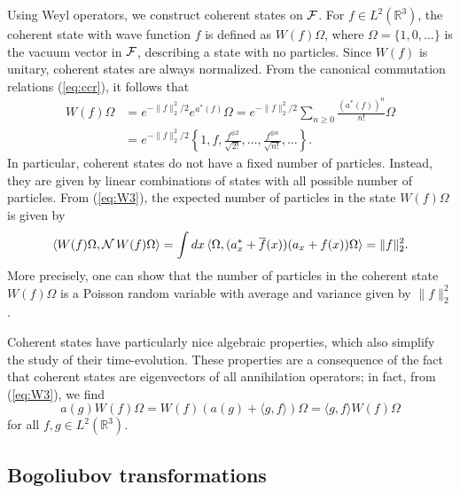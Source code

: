 \documentclass[11pt,a4paper]{article}
\newcommand{\bR}{{\mathbb R}}
\newcommand{\cF}{{\cal F}}
\newcommand{\cN}{{\cal N}}
\begin{document}
Using Weyl operators, we construct coherent states on $\cF$. For $f \in L^2 (\bR^3)$, the coherent state with wave function $f$ is defined as $W(f) \Omega$, where $\Omega = \{ 1, 0, \dots \}$ is the vacuum vector in $\cF$, describing a state with no particles. Since $W(f)$ is unitary, coherent states are always normalized. {F}rom the canonical commutation relations (\ref{eq:ccr}), it follows that  
\[ \begin{split} 
W(f) \Omega &= e^{-\| f \|_2^2 /2} e^{a^* (f)} \Omega = e^{-\| f\|_2^2/2}
\sum_{n \geq 0} \frac{(a^* (f))^n}{n!} \Omega \\ &= e^{-\| f\|_2^2/2}
\left\{ 1 , f , \frac{f^{\otimes 2}}{\sqrt{2!}} , \dots , \frac{f^{\otimes
n}}{\sqrt{n!}} , \dots \right\}. \end{split} \]
In particular, coherent states do not have a fixed number of particles. Instead, they are given by linear combinations of states with all possible number of particles. {F}rom (\ref{eq:W3}), the expected 
number of particles in the state $W(f) \Omega$ is given by
\[ \langle W(f) \Omega, \cN \, W(f) \Omega \rangle = \int dx \, \langle \Omega, (a_x^* + \overline{f} (x)) (a_x + f(x)) \Omega \rangle = \| f \|_2^2. \]
More precisely, one can show that the number of particles in the coherent state $W(f) \Omega$ is a Poisson random variable with average and variance given by $\| f \|_2^2$. 

\medskip

Coherent states have particularly nice algebraic properties, which also simplify the study of their time-evolution. These properties are a consequence of the fact that coherent states are eigenvectors of all annihilation operators; in fact, from (\ref{eq:W3}), we find 
\[  a(g) W(f) \Omega = W(f) ( a(g) + \langle g , f \rangle ) \Omega = \langle g ,f \rangle W(f) \Omega \]
for all $f,g \in L^2 (\bR^3)$.


\subsection{Bogoliubov transformations}
\label{sec:bt}
\end{document}
